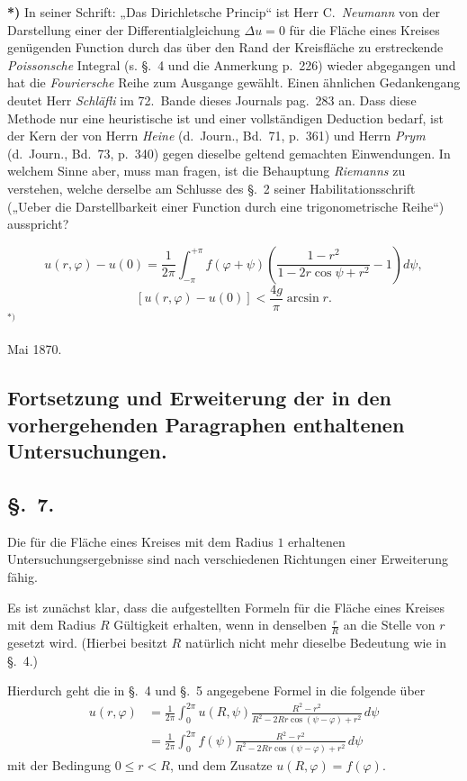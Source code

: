 \documentclass{article}
\begin{document}
\textbf{*)} In seiner Schrift: „Das Dirichletsche Princip`` ist Herr C.~\emph{Neumann} von der Darstellung einer der Differentialgleichung $\Delta u = 0$ für die Fläche eines Kreises genügenden Function durch das über den Rand der Kreisfläche zu erstreckende \emph{Poissonsche} Integral (s. §.~4 und die Anmerkung p.~226) wieder abgegangen und hat die \emph{Fouriersche} Reihe zum Ausgange gewählt. Einen ähnlichen Gedankengang deutet Herr \emph{Schläfli} im 72.~Bande dieses Journals pag.~283 an. Dass diese Methode nur eine heuristische ist und einer vollständigen Deduction bedarf, ist der Kern der von Herrn \emph{Heine} (d.~Journ., Bd.~71, p.~361) und Herrn \emph{Prym} (d.~Journ., Bd.~73, p.~340) gegen dieselbe geltend gemachten Einwendungen. In welchem Sinne aber, muss man fragen, ist die Behauptung \emph{Riemanns} zu verstehen, welche derselbe am Schlusse des §.~2 seiner Habilitationsschrift („Ueber die Darstellbarkeit einer Function durch eine trigonometrische Reihe``) ausspricht?

\[
u(r, \varphi) - u(0) = \frac{1}{2\pi} \int_{-\pi}^{+\pi} f(\varphi + \psi) \left( \frac{1 - r^2}{1 - 2r \cos\psi + r^2} - 1 \right) d\psi,
\]
\[
[u(r, \varphi) - u(0)] < \frac{4g}{\pi} \arcsin r.
\]${}^{*)}$

\begin{flushright}
Mai 1870.
\end{flushright}

\subsection*{Fortsetzung und Erweiterung der in den vorhergehenden Paragraphen enthaltenen Untersuchungen.}

\subsection*{§.~7.}

Die für die Fläche eines Kreises mit dem Radius $1$ erhaltenen Untersuchungsergebnisse sind nach verschiedenen Richtungen einer Erweiterung fähig.

Es ist zunächst klar, dass die aufgestellten Formeln für die Fläche eines Kreises mit dem Radius $R$ Gültigkeit erhalten, wenn in denselben $\frac{r}{R}$ an die Stelle von $r$ gesetzt wird. (Hierbei besitzt $R$ natürlich nicht mehr dieselbe Bedeutung wie in §.~4.)

Hierdurch geht die in §.~4 und §.~5 angegebene Formel in die folgende über
\[
\begin{aligned}
u(r, \varphi) &= \frac{1}{2\pi} \int_0^{2\pi} u(R, \psi) \frac{R^2 - r^2}{R^2 - 2Rr \cos(\psi - \varphi) + r^2}\,d\psi \\
&= \frac{1}{2\pi} \int_0^{2\pi} f(\psi) \frac{R^2 - r^2}{R^2 - 2Rr \cos(\psi - \varphi) + r^2}\,d\psi
\end{aligned}
\]
mit der Bedingung $0 \le r < R$, und dem Zusatze $u(R, \varphi) = f(\varphi)$.
\end{document}
